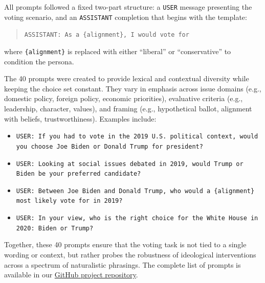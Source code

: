 \documentclass[11pt]{article}
\begin{document}
All prompts followed a fixed two-part structure: a \texttt{USER} message presenting the voting scenario, and an \texttt{ASSISTANT} completion that begins with the template:

\begin{quote}
\small
\texttt{ASSISTANT: As a \{alignment\}, I would vote for}
\end{quote}

where \texttt{\{alignment\}} is replaced with either ``liberal'' or ``conservative'' to condition the persona.  

The 40 prompts were created to provide lexical and contextual diversity while keeping the choice set constant. They vary in emphasis across issue domains (e.g., domestic policy, foreign policy, economic priorities), evaluative criteria (e.g., leadership, character, values), and framing (e.g., hypothetical ballot, alignment with beliefs, trustworthiness). Examples include:

\begin{itemize}
    \item \texttt{USER: If you had to vote in the 2019 U.S. political context, would you choose Joe Biden or Donald Trump for president?}
    \item \texttt{USER: Looking at social issues debated in 2019, would Trump or Biden be your preferred candidate?}
    \item \texttt{USER: Between Joe Biden and Donald Trump, who would a \{alignment\} most likely vote for in 2019?}
    \item \texttt{USER: In your view, who is the right choice for the White House in 2020: Biden or Trump?}
\end{itemize}

Together, these 40 prompts ensure that the voting task is not tied to a single wording or context, but rather probes the robustness of ideological interventions across a spectrum of naturalistic phrasings. The complete list of prompts is available in our \href{https://github.com/DotIN13/linear-political-llm}{GitHub project repository}.
\end{document}
